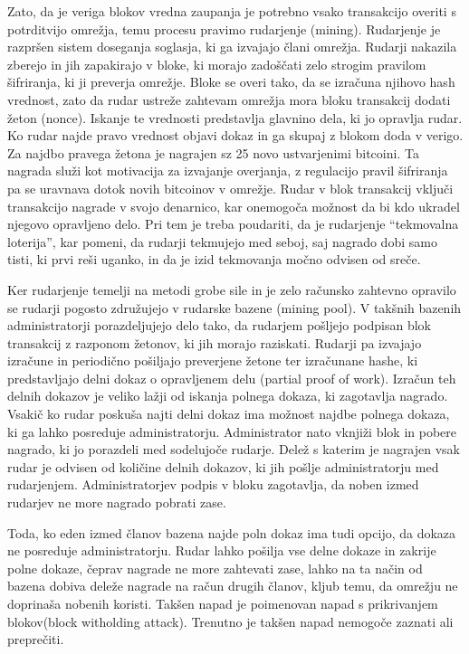 \documentclass{acm_proc_article-sp}
\begin{document}
Zato, da je veriga blokov vredna zaupanja je potrebno vsako transakcijo overiti s potrditvijo omrežja, temu procesu pravimo rudarjenje (mining). Rudarjenje je razpršen sistem doseganja soglasja, ki ga izvajajo člani omrežja. Rudarji nakazila zberejo in jih zapakirajo v bloke, ki morajo zadoščati zelo strogim pravilom šifriranja, ki ji preverja omrežje.  Bloke se overi tako, da se izračuna njihovo hash vrednost, zato da rudar ustreže zahtevam omrežja mora bloku transakcij dodati žeton (nonce). Iskanje te vrednosti predstavlja glavnino dela, ki jo opravlja rudar. Ko rudar najde pravo vrednost objavi dokaz in ga skupaj z blokom doda v verigo. Za najdbo pravega žetona je nagrajen sz 25 novo ustvarjenimi bitcoini. Ta nagrada služi kot motivacija za izvajanje overjanja, z regulacijo pravil šifriranja pa se uravnava dotok novih bitcoinov v omrežje. Rudar v blok transakcij vključi transakcijo nagrade v svojo denarnico, kar onemogoča možnost da bi kdo ukradel njegovo opravljeno delo. Pri tem je treba poudariti, da je rudarjenje “tekmovalna loterija”, kar pomeni, da rudarji tekmujejo med seboj, saj nagrado dobi samo tisti, ki prvi reši uganko, in da je izid tekmovanja močno odvisen od sreče.

Ker rudarjenje temelji na metodi grobe sile in je zelo računsko zahtevno opravilo se rudarji pogosto združujejo v rudarske bazene (mining pool). V takšnih bazenih administratorji porazdeljujejo delo tako, da rudarjem pošljejo podpisan blok transakcij z razponom žetonov, ki jih morajo raziskati. Rudarji pa izvajajo izračune in periodično pošiljajo preverjene žetone ter izračunane hashe, ki predstavljajo delni dokaz o opravljenem delu (partial proof of work). Izračun teh delnih dokazov je veliko lažji od iskanja polnega dokaza, ki zagotavlja nagrado. Vsakič ko rudar poskuša najti delni dokaz ima možnost najdbe polnega dokaza, ki ga lahko posreduje administratorju. Administrator nato vknjiži blok in pobere nagrado, ki jo porazdeli med sodelujoče rudarje. Delež s katerim je nagrajen vsak rudar je odvisen od količine delnih dokazov, ki jih pošlje administratorju med rudarjenjem. Administratorjev podpis v bloku zagotavlja, da noben izmed rudarjev ne more nagrado pobrati zase.

Toda, ko eden izmed članov bazena najde poln dokaz ima tudi opcijo, da dokaza ne posreduje administratorju. Rudar lahko pošilja vse delne dokaze in zakrije polne dokaze, čeprav nagrade ne more zahtevati zase, lahko na ta način od bazena dobiva deleže nagrade na račun drugih članov, kljub temu, da omrežju ne doprinaša nobenih koristi. Takšen napad je poimenovan napad s prikrivanjem blokov(block witholding attack). Trenutno je takšen napad nemogoče zaznati ali preprečiti.
\end{document}
